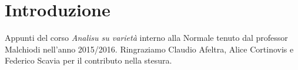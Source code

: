 \chapter{Introduzione}

Appunti del corso \emph{Analisu su varietà} interno alla Normale tenuto dal professor Malchiodi nell'anno 2015/2016.
Ringraziamo Claudio Afeltra, Alice Cortinovis e Federico Scavia per il contributo nella stesura.